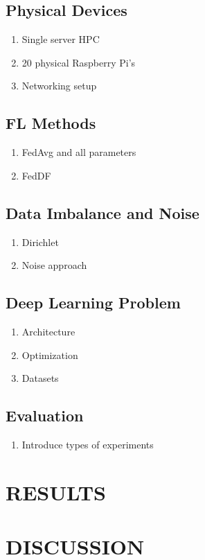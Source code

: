 \documentclass{article}
\begin{document}
\subsection{Physical Devices}
\begin{enumerate}
    \item Single server HPC 
    \item 20 physical Raspberry Pi's
    \item Networking setup
\end{enumerate}

\subsection{FL Methods}
\begin{enumerate}
    \item FedAvg and all parameters
    \item FedDF
\end{enumerate}

\subsection{Data Imbalance and Noise}
\begin{enumerate}
    \item Dirichlet
    \item Noise approach
\end{enumerate}

\subsection{Deep Learning Problem}
\begin{enumerate}
    \item Architecture
    \item Optimization
    \item Datasets
\end{enumerate}

\subsection{Evaluation}
\begin{enumerate}
    \item Introduce types of experiments
\end{enumerate}

\section{RESULTS}%
\label{sec:results}

\section{DISCUSSION}%
\label{sec:discussion}

\vfill
\pagebreak



\end{document}
